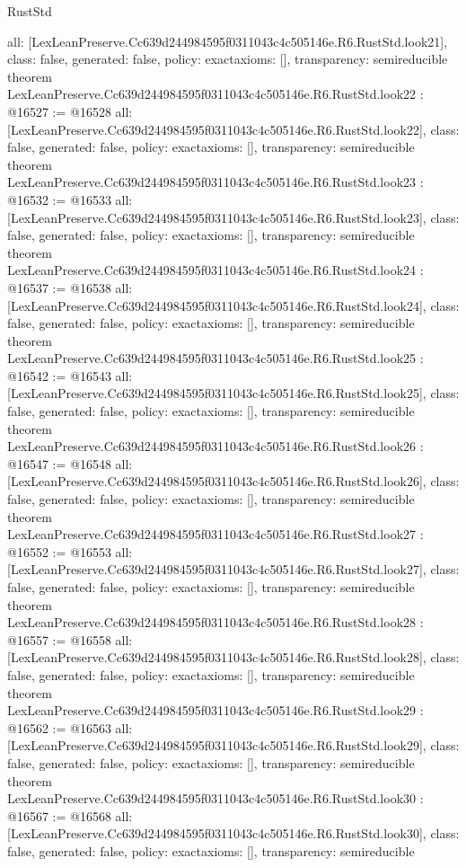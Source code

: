 \begin{lexlean}{RustStd}
\begin{coremodule}
{  all: [LexLeanPreserve.Cc639d244984595f0311043c4c505146e.R6.RustStd.look21],
  class: false,
  generated: false,
  policy: exact{axioms: []},
  transparency: semireducible
}
theorem LexLeanPreserve.Cc639d244984595f0311043c4c505146e.R6.RustStd.look22 : @16527 := @16528 {
  all: [LexLeanPreserve.Cc639d244984595f0311043c4c505146e.R6.RustStd.look22],
  class: false,
  generated: false,
  policy: exact{axioms: []},
  transparency: semireducible
}
theorem LexLeanPreserve.Cc639d244984595f0311043c4c505146e.R6.RustStd.look23 : @16532 := @16533 {
  all: [LexLeanPreserve.Cc639d244984595f0311043c4c505146e.R6.RustStd.look23],
  class: false,
  generated: false,
  policy: exact{axioms: []},
  transparency: semireducible
}
theorem LexLeanPreserve.Cc639d244984595f0311043c4c505146e.R6.RustStd.look24 : @16537 := @16538 {
  all: [LexLeanPreserve.Cc639d244984595f0311043c4c505146e.R6.RustStd.look24],
  class: false,
  generated: false,
  policy: exact{axioms: []},
  transparency: semireducible
}
theorem LexLeanPreserve.Cc639d244984595f0311043c4c505146e.R6.RustStd.look25 : @16542 := @16543 {
  all: [LexLeanPreserve.Cc639d244984595f0311043c4c505146e.R6.RustStd.look25],
  class: false,
  generated: false,
  policy: exact{axioms: []},
  transparency: semireducible
}
theorem LexLeanPreserve.Cc639d244984595f0311043c4c505146e.R6.RustStd.look26 : @16547 := @16548 {
  all: [LexLeanPreserve.Cc639d244984595f0311043c4c505146e.R6.RustStd.look26],
  class: false,
  generated: false,
  policy: exact{axioms: []},
  transparency: semireducible
}
theorem LexLeanPreserve.Cc639d244984595f0311043c4c505146e.R6.RustStd.look27 : @16552 := @16553 {
  all: [LexLeanPreserve.Cc639d244984595f0311043c4c505146e.R6.RustStd.look27],
  class: false,
  generated: false,
  policy: exact{axioms: []},
  transparency: semireducible
}
theorem LexLeanPreserve.Cc639d244984595f0311043c4c505146e.R6.RustStd.look28 : @16557 := @16558 {
  all: [LexLeanPreserve.Cc639d244984595f0311043c4c505146e.R6.RustStd.look28],
  class: false,
  generated: false,
  policy: exact{axioms: []},
  transparency: semireducible
}
theorem LexLeanPreserve.Cc639d244984595f0311043c4c505146e.R6.RustStd.look29 : @16562 := @16563 {
  all: [LexLeanPreserve.Cc639d244984595f0311043c4c505146e.R6.RustStd.look29],
  class: false,
  generated: false,
  policy: exact{axioms: []},
  transparency: semireducible
}
theorem LexLeanPreserve.Cc639d244984595f0311043c4c505146e.R6.RustStd.look30 : @16567 := @16568 {
  all: [LexLeanPreserve.Cc639d244984595f0311043c4c505146e.R6.RustStd.look30],
  class: false,
  generated: false,
  policy: exact{axioms: []},
  transparency: semireducible
}
\end{coremodule}
\end{lexlean}
